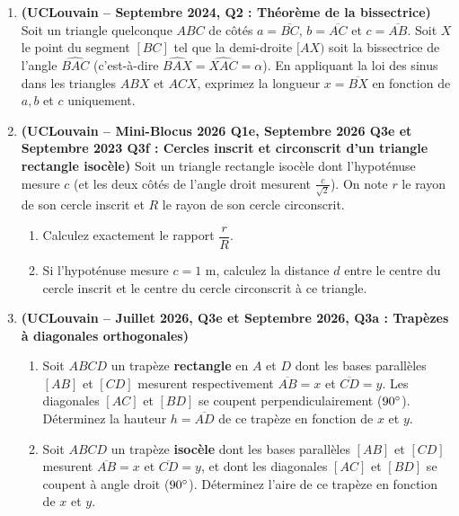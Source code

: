 \begin{enumerate}[label=\textbf{Exercice 4.\arabic* --}, align=left, leftmargin=*]
    \item \textbf{(UCLouvain -- Septembre 2024, Q2 : Théorème de la bissectrice)} Soit un triangle quelconque $ABC$ de côtés $a = \overline{BC}$, $b = \overline{AC}$ et $c = \overline{AB}$. Soit $X$ le point du segment $[BC]$ tel que la demi-droite $[AX)$ soit la bissectrice de l'angle $\widehat{BAC}$ (c'est-à-dire $\widehat{BAX} = \widehat{XAC} = \alpha$). En appliquant la loi des sinus dans les triangles $ABX$ et $ACX$, exprimez la longueur $x = \overline{BX}$ en fonction de $a, b$ et $c$ uniquement.

    \item \textbf{(UCLouvain -- Mini-Blocus 2026 Q1e, Septembre 2026 Q3e et Septembre 2023 Q3f : Cercles inscrit et circonscrit d'un triangle rectangle isocèle)} Soit un triangle rectangle isocèle dont l'hypoténuse mesure $c$ (et les deux côtés de l'angle droit mesurent $\frac{c}{\sqrt{2}}$). On note $r$ le rayon de son cercle inscrit et $R$ le rayon de son cercle circonscrit.
    \begin{enumerate}
        \item Calculez exactement le rapport $\dfrac{r}{R}$.
        \item Si l'hypoténuse mesure $c = 1\text{ m}$, calculez la distance $d$ entre le centre du cercle inscrit et le centre du cercle circonscrit à ce triangle.
    \end{enumerate}

    \item \textbf{(UCLouvain -- Juillet 2026, Q3e et Septembre 2026, Q3a : Trapèzes à diagonales orthogonales)}
    \begin{enumerate}
        \item Soit $ABCD$ un trapèze \textbf{rectangle} en $A$ et $D$ dont les bases parallèles $[AB]$ et $[CD]$ mesurent respectivement $\overline{AB} = x$ et $\overline{CD} = y$. Les diagonales $[AC]$ et $[BD]$ se coupent perpendiculairement ($90\degree$). Déterminez la hauteur $h = \overline{AD}$ de ce trapèze en fonction de $x$ et $y$.
        \item Soit $ABCD$ un trapèze \textbf{isocèle} dont les bases parallèles $[AB]$ et $[CD]$ mesurent $\overline{AB} = x$ et $\overline{CD} = y$, et dont les diagonales $[AC]$ et $[BD]$ se coupent à angle droit ($90\degree$). Déterminez l'aire de ce trapèze en fonction de $x$ et $y$.
    \end{enumerate}


\end{enumerate}
